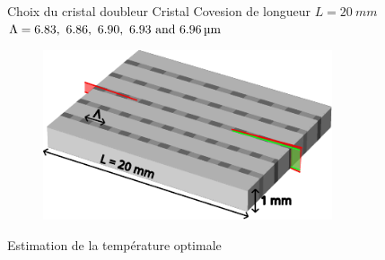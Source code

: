 \documentclass{beamer}
\begin{document}
\begin{frame}{Choix du cristal doubleur}
Cristal Covesion de longueur $L=\SI{20}{mm}$ \\
$\Lambda = \qtylist[list-units = single]{6.83; 6.86 ; 6.90 ; 6.93 ; 6,96}{\micro\meter}$
\begin{figure}
\centering
\includegraphics[height=5cm]{img/cristal2.pdf} %
\end{figure}
\end{frame}

\begin{frame}{Estimation de la température optimale}
\centering


\end{frame}
\end{document}
